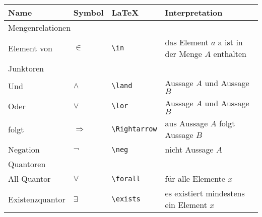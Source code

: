 \documentclass{lehramt-informatik-haupt}
\begin{document}
\begin{tabular}{l|l|l|l}
\textbf{Name} & \textbf{Symbol} & \textbf{LaTeX} & \textbf{Interpretation}\\

\hline
\hline

\multicolumn{4}{l}{Mengenrelationen} \\

\hline
\hline

Element von & $\in$ & \verb|\in| & das Element $a$  a ist in der Menge $A$ enthalten \\

\hline

\multicolumn{4}{l}{Junktoren} \\

\hline
\hline

Und & $\land$ & \verb|\land| & Aussage $A$ und Aussage $B$ \\

Oder & $\lor$ & \verb|\lor| & Aussage $A$ und Aussage $B$ \\

folgt & $\Rightarrow$ & \verb|\Rightarrow| & aus Aussage $A$ folgt Aussage $B$ \\

Negation & $\neg$ & \verb|\neg| & nicht Aussage $A$\\

\hline

\multicolumn{4}{l}{Quantoren} \\

\hline
\hline

All-Quantor & $\forall$ & \verb|\forall| & für alle Elemente $x$ \\

Existenzquantor & $\exists$ & \verb|\exists| & es existiert mindestens ein Element $x$\\

\end{tabular}

%
\end{document}
